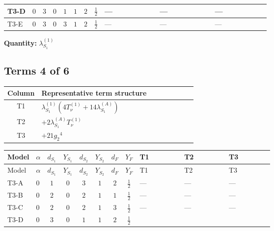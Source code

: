 \documentclass[8pt]{article}
\begin{document}
\begin{landscape}
\begin{longtable}{@{}llcccccc >{\raggedright\arraybackslash}p{0.21\linewidth} >{\raggedright\arraybackslash}p{0.21\linewidth} >{\raggedright\arraybackslash}p{0.21\linewidth}@{}}
\midrule
T3-D & $0$ & $3$ & $0$ & $1$ & $1$ & $2$ & $\frac{1}{2}$ & --- & --- & --- \\
\midrule
T3-E & $0$ & $3$ & $0$ & $3$ & $1$ & $2$ & $\frac{1}{2}$ & --- & --- & --- \\
\midrule
\bottomrule
\end{longtable}
\clearpage
\noindent\textbf{Quantity: }$\lambda_{S_1}^{(1)}$\par\smallskip
\subsection*{Terms 4 of 6}
\begin{center}
\begin{tabular}{@{}c >{\raggedright\arraybackslash}p{0.82\linewidth}@{}}
\toprule
Column & Representative term structure \\
\midrule
T1 & \(\displaystyle {\lambda_{S_1}^{(1)}} (4 T_{\nu}^{(1)}+14 {\lambda_{S_1}^{(A)}})\) \\
\midrule
T2 & \(\displaystyle +2 {\lambda_{S_1}^{(A)}} T_{\nu}^{(1)}\) \\
\midrule
T3 & \(\displaystyle +21 {g_2}^4\) \\
\midrule
\bottomrule
\end{tabular}
\end{center}
\smallskip
\tiny
\begin{longtable}{@{}llcccccc >{\raggedright\arraybackslash}p{0.21\linewidth} >{\raggedright\arraybackslash}p{0.21\linewidth} >{\raggedright\arraybackslash}p{0.21\linewidth}@{}}
\toprule
Model & $\alpha$ & $d_{S_1}$ & $Y_{S_1}$ & $d_{S_2}$ & $Y_{S_2}$ & $d_F$ & $Y_F$ & T1 & T2 & T3 \\
\midrule
\endfirsthead
\toprule
Model & $\alpha$ & $d_{S_1}$ & $Y_{S_1}$ & $d_{S_2}$ & $Y_{S_2}$ & $d_F$ & $Y_F$ & T1 & T2 & T3 \\
\midrule
\endhead
T3-A & $0$ & $1$ & $0$ & $3$ & $1$ & $2$ & $\frac{1}{2}$ & --- & --- & --- \\
\midrule
T3-B & $0$ & $2$ & $0$ & $2$ & $1$ & $1$ & $\frac{1}{2}$ & --- & --- & --- \\
\midrule
T3-C & $0$ & $2$ & $0$ & $2$ & $1$ & $3$ & $\frac{1}{2}$ & --- & --- & --- \\
\midrule
T3-D & $0$ & $3$ & $0$ & $1$ & $1$ & $2$ & $\frac{1}{2}$ & \scriptsize\adjustbox{max width=\linewidth}{$\begin{gathered} {\lambda_{S_1}^{(1)}} (4 T_{\nu}^{(1)}+14 {\lambda_{S_1}^{(A)}})\end{gathered}$} & \scriptsize\adjustbox{max width=\linewidth}{$\begin{gathered} +2 {\lambda_{S_1}^{(A)}} T_{\nu}^{(1)}\end{gathered}$} & \scriptsize\adjustbox{max width=\linewidth}{$\begin{gathered} +21 {g_2}^4\end{gathered}$} \\

\end{longtable}
\end{landscape}
\end{document}
